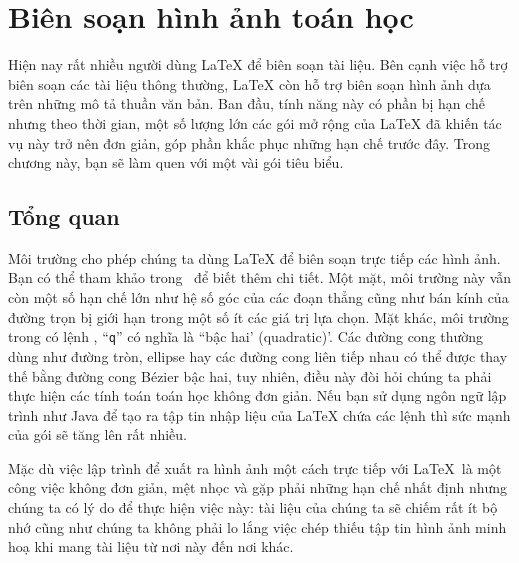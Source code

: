 \setcounter{chapter}{4}
\newcommand{\graphicscompanion}{\emph{The \LaTeX{} Graphics Companion}~\cite{graphicscompanion}} 
\newcommand{\hobby}{\emph{A User's Manual for MetaPost}~\cite{metapost}}
\newcommand{\hoenig}{\emph{\TeX{} Unbound}~\cite{unbound}}
\newcommand{\graphicsinlatex}{\emph{Graphics in \LaTeXe{}}~\cite{ursoswald}}

\chapter{Biên soạn hình ảnh toán học}

\begin{intro}
Hiện nay rất nhiều người dùng \LaTeX{} để biên soạn tài liệu. Bên cạnh việc hỗ trợ biên soạn các tài liệu thông thường, \LaTeX{} còn hỗ trợ biên soạn hình ảnh dựa trên những mô tả thuần văn bản. Ban đầu, tính năng này có phần bị hạn chế nhưng theo thời gian, một số lượng lớn các gói mở rộng của \LaTeX{} đã khiến tác vụ này trở nên đơn giản, góp phần khắc phục những hạn chế trước đây. Trong chương này, bạn sẽ làm quen với một vài gói tiêu biểu.
\end{intro}

\section{Tổng quan}

Môi trường  cho phép chúng ta dùng \LaTeX{} để biên soạn trực tiếp các hình ảnh. Bạn có thể tham khảo trong \manual\ để biết thêm chi tiết. Một mặt, môi trường này vẫn còn một số hạn chế lớn như hệ số góc của các đoạn thẳng cũng như bán kính của đường trọn bị giới hạn trong một số ít các giá trị lựa chọn. Mặt khác, môi trường  trong \LaTeXe{} có lệnh , ``\texttt{q}'' có nghĩa là ``bậc hai' (quadratic)'. Các đường cong thường dùng như đường tròn, ellipse hay các đường cong liên tiếp nhau có thể được thay thế bằng đường cong B\'ezier bậc hai, tuy nhiên, điều này đòi hỏi chúng ta phải thực hiện các tính toán toán học không đơn giản. Nếu bạn sử dụng ngôn ngữ lập trình như Java để tạo ra tập tin nhập liệu của \LaTeX{} chứa các lệnh  thì sức mạnh của  gói  sẽ tăng lên rất nhiều.

Mặc dù việc lập trình để xuất ra hình ảnh một cách trực tiếp với \LaTeX\ là một công việc không đơn giản, mệt nhọc và gặp phải những hạn chế nhất định nhưng chúng ta có lý do để thực hiện việc này: tài liệu của chúng ta sẽ chiếm rất ít bộ nhớ cũng như chúng ta không phải lo lắng việc chép thiếu tập tin hình ảnh minh hoạ khi mang tài liệu từ nơi này đến nơi khác.

